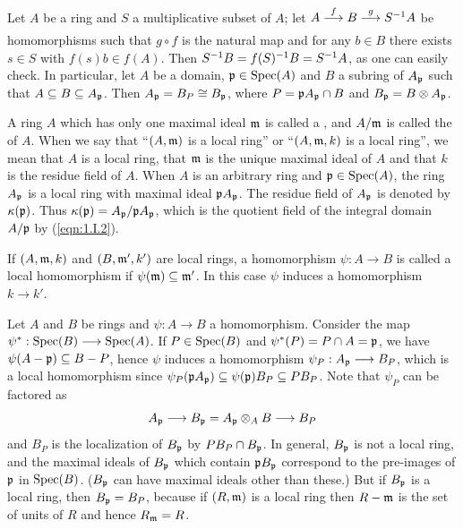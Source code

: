 \documentclass[../main]{subfiles}
\begin{document}
\newparagraph
Let $A$ be a ring and $S$ a multiplicative subset of $A$; let $A \varrightarrow fB\varrightarrow gS\inv A$ be homomorphisms such that $g\circ f$ is the natural map and for any $b\in B$ there exists $s\in S$ with $f(s)b\in f(A)$. Then $S^{-1} B=f(S)^{-1} B=S^{-1} A$, as one can easily check. In particular, let $A$ be a domain, $\mathfrak{p}\in\operatorname{Spec}(A)$ and $B$ a subring of $A_{\mathfrak{p}}$ such that $A\subseteq B\subseteq A_{\mathfrak{p}}$. Then $A_{\mathfrak{p}}=B_P\cong B_{\mathfrak{p}}$, where $P=\mathfrak{p}A_{\mathfrak{p}}\cap B$ and $B_{\mathfrak{p}}=B\otimes A_{\mathfrak{p}}$.

\newparagraph
A ring $A$ which has only one maximal ideal $\mathfrak{m}$ is called a , and $A/\mathfrak{m}$ is called the  of $A$. When we say that ``$(A,\mathfrak{m})$ is a local ring'' or ``$(A,\mathfrak{m},k)$ is a local ring'', we mean that $A$ is a local ring, that $\mathfrak{m}$ is the unique maximal ideal of $A$ and that $k$ is the residue field of $A$. When $A$ is an arbitrary ring and $\mathfrak{p}\in\operatorname{Spec}(A)$, the ring $A_{\mathfrak{p}}$ is a local ring with maximal ideal $\mathfrak{p}A_{\mathfrak{p}}$. The residue field of $A_{\mathfrak{p}}$ is denoted by $\kappa(\mathfrak{p})$.\label{sym:kappa} Thus $\kappa(\mathfrak{p})=A_{\mathfrak{p}}/\mathfrak{p}A_{\mathfrak{p}}$, which is the quotient field of the integral domain $A/\mathfrak{p}$ by (\ref{eqn:1.I.2}).

If $(A,\mathfrak{m},k)$ and $(B,\mathfrak{m}',k')$ are local rings, a homomorphism $\psi:A\longrightarrow B$ is called a local homomorphism if $\psi(\mathfrak{m})\subseteq\mathfrak{m}'$. In this case $\psi$ induces a homomorphism $k\longrightarrow k'$.

Let $A$ and $B$ be rings and $\psi:A\longrightarrow B$ a homomorphism. Consider the map $\psi^\ast:\operatorname{Spec}(B)\longrightarrow\operatorname{Spec}(A)$. If $P\in\operatorname{Spec}(B)$ and $\psi^\ast(P)=P\cap A=\mathfrak{p}$, we have $\psi(A-\mathfrak{p})\subseteq B-P$, hence $\psi$ induces a homomorphism $\psi_P:A_{\mathfrak{p}}\longrightarrow B_P$, which is a local homomorphism since $\psi_P(\mathfrak{p}A_{\mathfrak{p}})\subseteq\psi(\mathfrak{p})B_P\subseteq PB_P$. Note that $\psi_P$ can be factored as \[A_{\mathfrak{p}}\longrightarrow B_{\mathfrak{p}}=A_{\mathfrak{p}}\otimes_AB\longrightarrow B_P\] and $B_P$ is the localization of $B_{\mathfrak{p}}$ by $PB_P\cap B_{\mathfrak{p}}$. In general, $B_{\mathfrak{p}}$ is not a local ring, and the maximal ideals of $B_{\mathfrak{p}}$ which contain $\mathfrak{p}B_{\mathfrak{p}}$ correspond to the pre-images of $\mathfrak{p}$ in $\operatorname{Spec}(B)$. ($B_{\mathfrak{p}}$ can have maximal ideals other than these.) But if $B_{\mathfrak{p}}$ is a local ring, then $B_{\mathfrak{p}}=B_P$, because if $(R,\mathfrak{m})$ is a local ring then $R-\mathfrak{m}$ is the set of units of $R$ and hence $R_{\mathfrak{m}}=R$.
\end{document}
